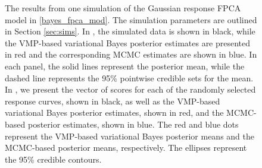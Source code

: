 \documentclass[12pt]{article}
\theoremstyle{plain}
\theoremstyle{definition}
\theoremstyle{remark}
\begin{document}
\begin{figure}[t!]
\centering
\tabskip=0pt
\caption{
	The results from one simulation of the Gaussian response FPCA model in \eqref{bayes_fpca_mod}. The
	simulation parameters are outlined in Section \ref{sec:sims}.
	In , the simulated data is shown in black, while the VMP-based
	variational Bayes posterior estimates are presented in red and the corresponding MCMC estimates
	are shown in blue. In each panel, the solid lines represent
	the posterior mean, while the dashed line represents the 95\% pointwise credible sets for the mean.
	In , we present the vector of scores for each of the
	randomly selected response curves,
	shown in black, as well as the VMP-based variational Bayes posterior estimates, shown in red, and the
	MCMC-based posterior estimates, shown in blue. The red and blue dots represent the VMP-based
	variational Bayes posterior means and the MCMC-based posterior means, respectively.
	The ellipses represent the 95\% credible contours.
}
\label{fig:gauss_resp_sim}
\end{figure}
\end{document}

